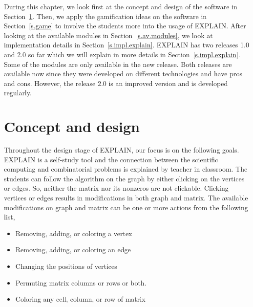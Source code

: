 \documentclass[12pt, twoside,a4paper,toc=bibliography]{scrbook}
\newcommand{\secref}[1]{Section~\protect\ref{#1}}
\begin{document}
During this chapter, we look first at the concept and design of the software in
\secref{s.concept}. Then, we apply the gamification ideas on the software in
\secref{s.game} to involve the students more into the usage of \mbox{EXPLAIN}.
After looking at the available modules in \secref{s.av.modules}, we look at
implementation details in \secref{s.impl.explain}.
\mbox{EXPLAIN} has two releases 1.0 and 2.0 so far which we will explain in more
details in \secref{s.impl.explain}. Some of the modules
are only available in the new release. Both releases
are available now since they were developed on different technologies and have
pros and cons. However, the release 2.0 is an improved version and is developed
regularly.
\section{Concept and design}
\label{s.concept}
Throughout the design stage of \mbox{EXPLAIN}, our focus is on the following goals.
\mbox{EXPLAIN} is a self-study tool and the connection between the scientific computing
and combinatorial problems is explained by teacher in classroom.
The students can follow the algorithm on the graph by either
clicking on the vertices or edges.
So, neither the matrix nor its nonzeros are not clickable.
Clicking vertices or edges results in modifications in both graph and matrix.
The available modifications on graph and matrix can be one or more actions
from the following list,
\begin{itemize}
\item Removing, adding, or coloring a vertex
\item Removing, adding, or coloring an edge
\item Changing the positions of vertices
\item Permuting matrix columns or rows or both.
\item Coloring any cell, column, or row of matrix
\end{itemize}
\end{document}

